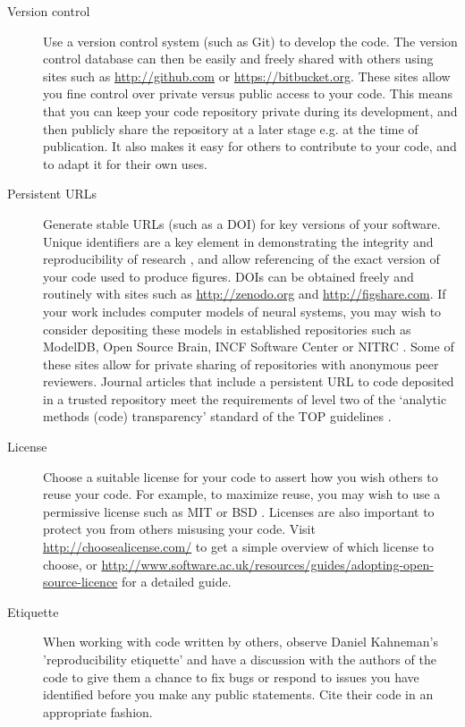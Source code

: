 \documentclass[11pt]{article}
\begin{document}
\begin{description}
\item [Version control] Use a version control system (such as Git) to
  develop the code.  The version control database can then be easily
  and freely shared with others using sites such as
  \url{http://github.com} \cite{Ram2013} or
  \url{https://bitbucket.org}.  These sites allow you fine control
  over private versus public access to your code.  This means that you
  can keep your code repository private during its development, and
  then publicly share the repository at a later stage e.g. at the time
  of publication. It also makes it easy for others to contribute to your code, and to adapt it for their own uses. 

\item [Persistent URLs] Generate stable URLs (such as a DOI) for key
  versions of your software.  Unique identifiers are a key element in
  demonstrating the integrity and reproducibility of research
  \cite{vasilevsky2013reproducibility}, and allow referencing of the 
  exact version of your code used to produce figures. DOIs can be
  obtained freely and routinely with sites such as
  \url{http://zenodo.org} and \url{http://figshare.com}.  If your work
  includes computer models of neural systems, you may wish to consider
  depositing these models in established repositories such as
  ModelDB\cite{modeldb}, Open Source Brain\cite{osb}, INCF
  Software Center\cite{web:incf-software} or NITRC
  \cite{poline_software_2014}. Some of these sites allow for private
  sharing of repositories with anonymous peer reviewers. Journal
  articles that include a persistent URL to code deposited in a
  trusted repository meet the requirements of level two of the
  `analytic methods (code) transparency' standard of the TOP
  guidelines \cite{Nosek2015}.


\item [License] Choose a suitable license for your code to assert how
  you wish others to reuse your code.  For example, to maximize reuse,
  you may wish to use a permissive license such as MIT or BSD
  \cite{stodden2009enabling}.  Licenses are also important to protect you from
  others misusing your code.  Visit \url{http://choosealicense.com/}
  to get a simple overview of which license to choose, or 
  \url{http://www.software.ac.uk/resources/guides/adopting-open-source-licence}
  for a detailed guide.

\item [Etiquette] When working with code written by others, observe
  Daniel Kahneman's 'reproducibility etiquette'\cite{Kahneman2014} and
  have a discussion with the authors of the code to give them a chance
  to fix bugs or respond to issues you have identified before you make
  any public statements.  Cite their code in an appropriate fashion.



\end{description}
\end{document}

